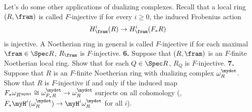 \documentclass[12pt]{amsart}
\numberwithin{equation}{theorem}
\renewcommand{\:}{\colon}
\theoremstyle{theorem}
\newcommand{\sol}[1]{ \vskip 6pt{\color{blue} {\bf Solution:} #1} \vskip 6pt}
\begin{document}
\newpage
Let's do some other applications of dualizing complexes.  Recall that a local ring $(R, \fram)$ is called $F$-injective if for every $i \geq 0$, the induced Frobenius action
\[
H^i_{\fram}(R) \to H^i_{\fram}(F_* R)
\]
is injective.  A Noetherian ring in general is called $F$-injective if for each maximal ${\fram} \in \Spec R$, $R_{\fram}$ is $F$-injective.
\vskip 3pt
\noindent
{\bf 6.}  Suppose that $(R, \fram)$ is an $F$-finite Noetherian local ring.  Show that for each $Q \in \Spec R$, $R_Q$ is $F$-injective.
\vskip 200pt
\noindent
{\bf 7.}  Suppose that $R$ is an $F$-finite Noetherian ring with dualizing complex $\omega_R^{\mydot}$.  Show that $R$ is $F$-injective if and only if the induced map $F_* \omega_{R^{\mydot}} \cong \omega_{F_* R}^{\mydot} \to \omega_R^{\mydot}$ surjects on all cohomology (\ie, $F_* \myH^i (\omega_R^{\mydot}) \to \myH^i \omega_R^{\mydot}$ for all $i$).
\end{document}
